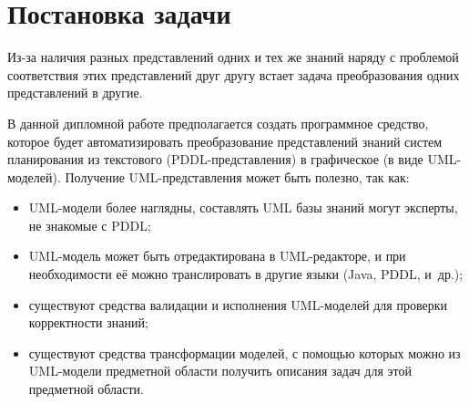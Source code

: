 \chapter{Постановка задачи}

    Из-за наличия разных представлений одних и тех же знаний наряду с проблемой соответствия этих представлений друг другу встает задача преобразования одних представлений в другие.
 
    В данной дипломной работе предполагается создать программное средство, которое будет автоматизировать преобразование представлений знаний систем планирования из текстового (PDDL-представления) в графическое (в виде UML-моделей).
 Получение UML-представления может быть полезно, так как:
    \begin{itemize}
        \item UML-модели более наглядны, составлять UML базы знаний могут эксперты, не знакомые с PDDL;
        \item UML-модель может быть отредактирована в UML-редакторе, и при необходимости её можно транслировать в другие языки (Java, PDDL, и~др.);
        \item существуют средства валидации и исполнения UML-моделей для проверки корректности знаний\cite{use}; 
        \item существуют средства трансформации моделей, с помощью которых можно из UML-модели предметной области получить описания задач для этой предметной области.
    \end{itemize}

